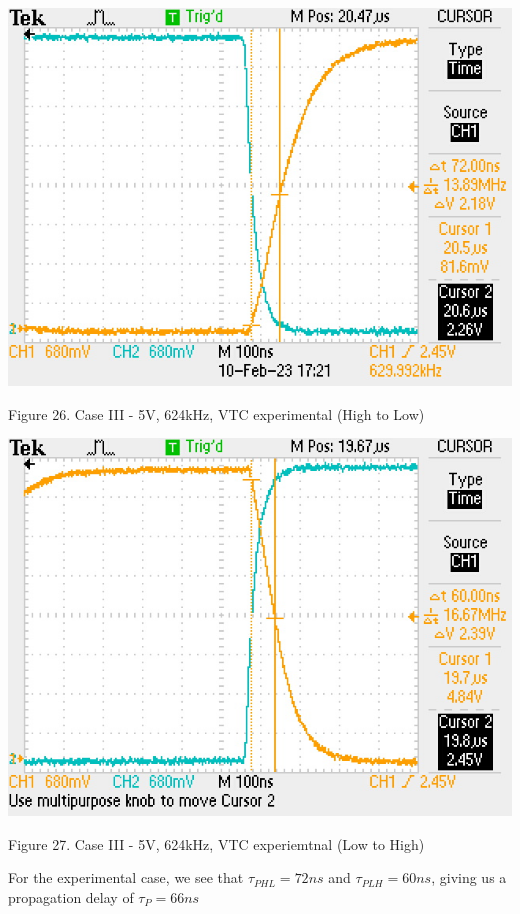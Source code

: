 \documentclass[conference]{IEEEtran}
\begin{document}
\begin{center}
    \centerline{\includegraphics[scale = 0.9]{figures/case3_HL_experimental.JPG}}
    Figure 26. Case III - 5V, 624kHz, VTC experimental (High to Low)
\end{center} 

\begin{center}
    \centerline{\includegraphics[scale = 0.9]{figures/case3_LH_experimental.JPG}}
    Figure 27. Case III - 5V, 624kHz, VTC experiemtnal (Low to High)
\end{center} 

For the experimental case, we see that $\tau_{PHL} = 72ns$ and 
$\tau_{PLH} = 60ns$, giving us a propagation delay of $\tau_P = 66ns$
\end{document}

